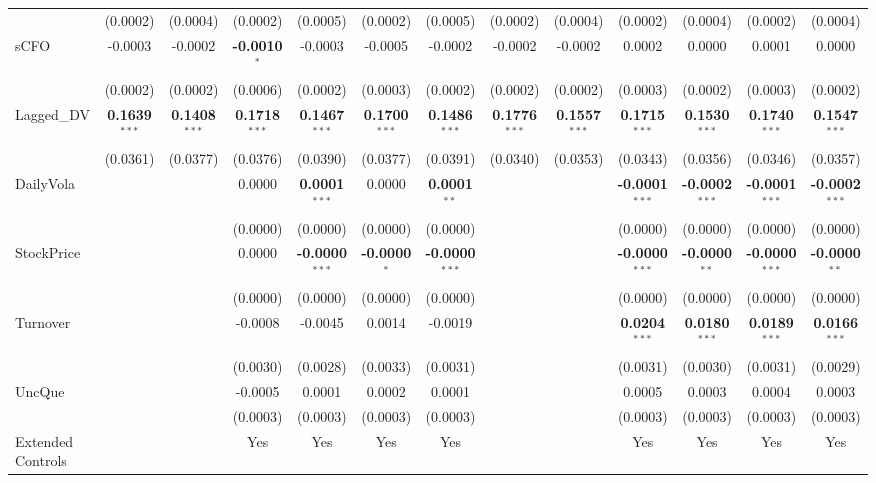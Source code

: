 \documentclass[11pt,a4paper]{article}
\begin{document}
\begin{table}[htbp]
\begin{tabular}{lcccccccccccc}
 & (0.0002) & (0.0004) & (0.0002) & (0.0005) & (0.0002) & (0.0005) & (0.0002) & (0.0004) & (0.0002) & (0.0004) & (0.0002) & (0.0004) \\
sCFO & -0.0003 & -0.0002 & \textbf{-0.0010}$^{*}$ & -0.0003 & -0.0005 & -0.0002 & -0.0002 & -0.0002 & 0.0002 & 0.0000 & 0.0001 & 0.0000 \\
 & (0.0002) & (0.0002) & (0.0006) & (0.0002) & (0.0003) & (0.0002) & (0.0002) & (0.0002) & (0.0003) & (0.0002) & (0.0003) & (0.0002) \\
Lagged\_DV & \textbf{0.1639}$^{***}$ & \textbf{0.1408}$^{***}$ & \textbf{0.1718}$^{***}$ & \textbf{0.1467}$^{***}$ & \textbf{0.1700}$^{***}$ & \textbf{0.1486}$^{***}$ & \textbf{0.1776}$^{***}$ & \textbf{0.1557}$^{***}$ & \textbf{0.1715}$^{***}$ & \textbf{0.1530}$^{***}$ & \textbf{0.1740}$^{***}$ & \textbf{0.1547}$^{***}$ \\
 & (0.0361) & (0.0377) & (0.0376) & (0.0390) & (0.0377) & (0.0391) & (0.0340) & (0.0353) & (0.0343) & (0.0356) & (0.0346) & (0.0357) \\
DailyVola &  &  & 0.0000 & \textbf{0.0001}$^{***}$ & 0.0000 & \textbf{0.0001}$^{**}$ &  &  & \textbf{-0.0001}$^{***}$ & \textbf{-0.0002}$^{***}$ & \textbf{-0.0001}$^{***}$ & \textbf{-0.0002}$^{***}$ \\
 &  &  & (0.0000) & (0.0000) & (0.0000) & (0.0000) &  &  & (0.0000) & (0.0000) & (0.0000) & (0.0000) \\
StockPrice &  &  & 0.0000 & \textbf{-0.0000}$^{***}$ & \textbf{-0.0000}$^{*}$ & \textbf{-0.0000}$^{***}$ &  &  & \textbf{-0.0000}$^{***}$ & \textbf{-0.0000}$^{**}$ & \textbf{-0.0000}$^{***}$ & \textbf{-0.0000}$^{**}$ \\
 &  &  & (0.0000) & (0.0000) & (0.0000) & (0.0000) &  &  & (0.0000) & (0.0000) & (0.0000) & (0.0000) \\
Turnover &  &  & -0.0008 & -0.0045 & 0.0014 & -0.0019 &  &  & \textbf{0.0204}$^{***}$ & \textbf{0.0180}$^{***}$ & \textbf{0.0189}$^{***}$ & \textbf{0.0166}$^{***}$ \\
 &  &  & (0.0030) & (0.0028) & (0.0033) & (0.0031) &  &  & (0.0031) & (0.0030) & (0.0031) & (0.0029) \\
UncQue &  &  & -0.0005 & 0.0001 & 0.0002 & 0.0001 &  &  & 0.0005 & 0.0003 & 0.0004 & 0.0003 \\
 &  &  & (0.0003) & (0.0003) & (0.0003) & (0.0003) &  &  & (0.0003) & (0.0003) & (0.0003) & (0.0003) \\
\midrule
Extended Controls &  &  & Yes & Yes & Yes & Yes &  &  & Yes & Yes & Yes & Yes \\

\end{tabular}
\end{table}
\end{document}
